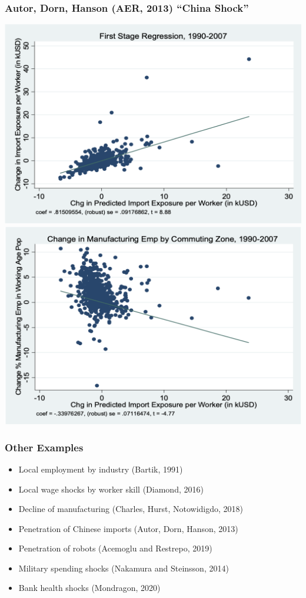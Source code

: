 \documentclass[english,xcolor=svgnames]{beamer}
\begin{document}
	\begin{frame}
	\frametitle[alignment=center]{Autor, Dorn, Hanson (AER, 2013) ``China Shock''}
	\centering
	\includegraphics[scale=0.325]{figures/ADHFIG1.png}\includegraphics[scale=0.325]{figures/ADHFIG2.png}
	\end{frame}

\begin{frame}
\frametitle[alignment=center]{Other Examples}
\begin{itemize}
	\item Local employment by industry (Bartik, 1991)
	\item Local wage shocks by worker skill (Diamond, 2016)
	\item Decline of manufacturing (Charles, Hurst, Notowidigdo, 2018)
	\item Penetration of Chinese imports (Autor, Dorn, Hanson, 2013)
	\item Penetration of robots (Acemoglu and Restrepo, 2019)
	\item Military spending shocks (Nakamura and Steinsson, 2014)
	\item Bank health shocks (Mondragon, 2020)
\end{itemize}
\end{frame}
\end{document}
